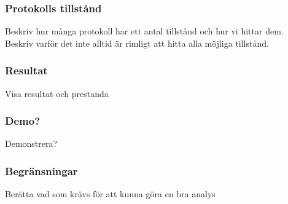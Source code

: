 \documentclass[xetex]{beamer}
\begin{document}
    \begin{frame}
        \frametitle{Protokolls tillstånd}
        Beskriv hur många protokoll har ett antal tillstånd och hur vi
        hittar dem. Beskriv varför det inte alltid är rimligt att hitta
        alla möjliga tillstånd.
    \end{frame}

    \begin{frame}
        \frametitle{Resultat}
        Visa resultat och prestanda
    \end{frame}
    \begin{frame}
        \frametitle{Demo?}
        Demonstrera?
    \end{frame}

    \begin{frame}
        \frametitle{Begränsningar}
        Berätta vad som krävs för att kunna göra en bra analys
    \end{frame}
\end{document}
